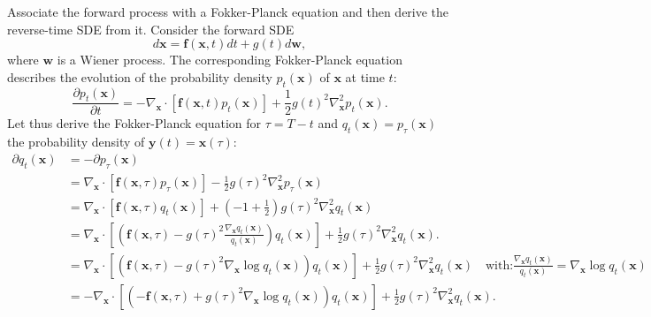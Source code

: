 \documentclass[11pt,a4paper]{article}
\begin{document}
\begin{compactproof}[title={Proof}]
 Associate the forward process with a Fokker-Planck equation and then derive the reverse-time SDE from it.
 Consider the forward SDE
\begin{equation*}
d\mathbf{x}
=
\mathbf{f}(\mathbf{x},t)dt
+
g(t)d\mathbf{w},
\end{equation*}
where $\mathbf{w}$ is a Wiener process. The corresponding Fokker-Planck equation describes the evolution of the probability density $p_t(\mathbf{x})$ of $\mathbf{x}$ at time $t$:
\begin{equation*}
\frac{\partial p_t(\mathbf{x})}{\partial t}
=
-\nabla_{\mathbf{x}}\cdot\left[\mathbf{f}(\mathbf{x},t)p_t(\mathbf{x})\right]
+
\frac{1}{2}g(t)^2\nabla_{\mathbf{x}}^2p_t(\mathbf{x}).
\end{equation*}
Let thus derive the  Fokker-Planck equation for $\tau = T-t$ and $q_t(\mathbf{x})=p_{\tau}(\mathbf{x})$ the probability density of $\mathbf{y}(t)=\mathbf{x}(\tau)$:
\begin{align*}
    \partial q_t(\mathbf{x})
    &=
    -\partial p_{\tau}(\mathbf{x})\\
    &=
    \nabla_{\mathbf{x}}\cdot\left[\mathbf{f}(\mathbf{x},\tau)p_{\tau}(\mathbf{x})\right]
    -
    \frac{1}{2}g(\tau)^2\nabla_{\mathbf{x}}^2p_{\tau}(\mathbf{x})\\
    &=
    \nabla_{\mathbf{x}}\cdot\left[\mathbf{f}(\mathbf{x},\tau)q_t(\mathbf{x})\right]
    +
    \left(-1+\frac{1}{2}\right)g(\tau)^2\nabla_{\mathbf{x}}^2q_t(\mathbf{x})\\
    &=
    \nabla_{\mathbf{x}}\cdot\left[\left(\mathbf{f}(\mathbf{x},\tau)-g(\tau)^2\frac{\nabla_{\mathbf{x}}q_t(\mathbf{x})}{q_t(\mathbf{x})}\right)q_t(\mathbf{x})\right]
    +
    \frac{1}{2}g(\tau)^2\nabla_{\mathbf{x}}^2q_t(\mathbf{x}).  \\
    &=
    \nabla_{\mathbf{x}}\cdot\left[\left(\mathbf{f}(\mathbf{x},\tau)-g(\tau)^2\nabla_{\mathbf{x}}\log q_t(\mathbf{x})\right)q_t(\mathbf{x})\right]
    +
    \frac{1}{2}g(\tau)^2\nabla_{\mathbf{x}}^2q_t(\mathbf{x}) \quad 
    {\scriptstyle \text{with:} \frac{\nabla_{\mathbf{x}}q_t(\mathbf{x})}{q_t(\mathbf{x})} = \nabla_{\mathbf{x}}\log q_t(\mathbf{x}) } \\
    &= 
    - \nabla_{\mathbf{x}}\cdot\left[\left(-\mathbf{f}(\mathbf{x},\tau)+g(\tau)^2\nabla_{\mathbf{x}}\log q_t(\mathbf{x})\right)q_t(\mathbf{x})\right]
    +
    \frac{1}{2}g(\tau)^2\nabla_{\mathbf{x}}^2q_t(\mathbf{x}).
\end{align*}


\end{compactproof}
\end{document}
